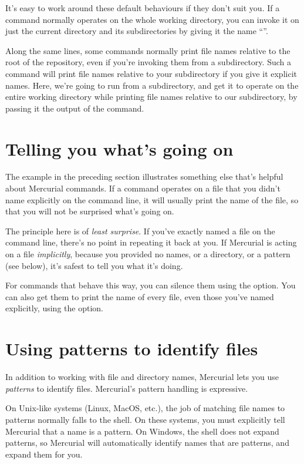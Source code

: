 It's easy to work around these default behaviours if they don't suit
you.  If a command normally operates on the whole working directory,
you can invoke it on just the current directory and its subdirectories
by giving it the name ``''.

Along the same lines, some commands normally print file names relative
to the root of the repository, even if you're invoking them from a
subdirectory.  Such a command will print file names relative to your
subdirectory if you give it explicit names.  Here, we're going to run
 from a subdirectory, and get it to operate on the
entire working directory while printing file names relative to our
subdirectory, by passing it the output of the  command.

\section{Telling you what's going on}

The  example in the preceding section illustrates something
else that's helpful about Mercurial commands.  If a command operates
on a file that you didn't name explicitly on the command line, it will
usually print the name of the file, so that you will not be surprised
what's going on.

The principle here is of \emph{least surprise}.  If you've exactly
named a file on the command line, there's no point in repeating it
back at you.  If Mercurial is acting on a file \emph{implicitly},
because you provided no names, or a directory, or a pattern (see
below), it's safest to tell you what it's doing.

For commands that behave this way, you can silence them using the
 option.  You can also get them to print the name of every
file, even those you've named explicitly, using the 
option.

\section{Using patterns to identify files}

In addition to working with file and directory names, Mercurial lets
you use \emph{patterns} to identify files.  Mercurial's pattern
handling is expressive.

On Unix-like systems (Linux, MacOS, etc.), the job of matching file
names to patterns normally falls to the shell.  On these systems, you
must explicitly tell Mercurial that a name is a pattern.  On Windows,
the shell does not expand patterns, so Mercurial will automatically
identify names that are patterns, and expand them for you.

